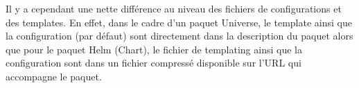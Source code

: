 \documentclass[11pt,fleqn]{book} %
\begin{document}
Il y a cependant une nette différence au niveau des fichiers de configurations et des templates. En effet, dans le cadre d'un paquet Universe, le template ainsi que la configuration (par défaut) sont directement dans la description du paquet alors que pour le paquet Helm (Chart), le fichier de templating ainsi que la configuration sont dans un fichier compressé disponible sur l'URL qui accompagne le paquet. \\



\end{document}
